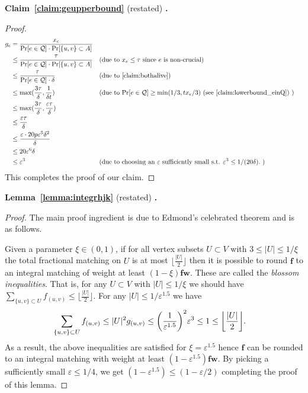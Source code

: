 \documentclass[letterpaper,11pt]{article}
\renewcommand{\epsilon}{\varepsilon}
\renewcommand{\epsilon}[0]{\ensuremath{\varepsilon}}
\let\originalleft\left
\let\originalright\right
\renewcommand{\left}{\mathopen{}\mathclose\bgroup\originalleft}
\renewcommand{\right}{\aftergroup\egroup\originalright}
\newcommand{\restateclaim}[2]{\noindent \textbf{Claim~#1} (restated) \textbf{.} {\em #2}}
\newcommand{\restatelem}[2]{\noindent \textbf{Lemma~#1} (restated) \textbf{.} {\em #2}}
\begin{document}
\restateclaim{\ref{claim:geupperbound}}{\claimgeupperbound{}}

\begin{proof}
\begin{align*}\label{eq:num14}
  g_e &= \frac{x_e}{\Pr[e \in \mathcal{Q}]\cdot\Pr[\{u, v\} \subset A]}  \\
  &\leq \frac{\tau}{\Pr[e \in \mathcal{Q}] \cdot \Pr[\{u, v\} \subset A] } 
  &&
    \text{(due to $x_e \leq \tau$ since $e$ is non-crucial)}
  \\
  &\leq \frac{\tau}{\Pr[e \in \mathcal{Q}] \cdot \delta } 
  &&
    \text{(due to \cref{claim:bothalive})}
  \\
  &\leq \max(\frac{3 \tau}{\delta}, \frac{1}{\delta t}) 
  &&
  \text{(due to $\Pr[e \in \mathcal{Q}] \geq \min(1/3, tx_e/3)$ (see \cref{claim:lowerbound_einQ}) )
  }
  \\
  &\leq \max(\frac{3 \tau}{\delta}, \frac{\epsilon \tau}{\delta}) \\
  &\leq \frac{\epsilon \tau}{\delta} \\
  &\leq \frac{\epsilon \cdot 20p\epsilon^5\delta^2}{\delta} \\
  &\leq 20\epsilon^6 \delta\\
  &\leq \epsilon^3 
  &&
  \text{(due to choosing an $\epsilon$ sufficiently small s.t. $\epsilon^3\leq 1/(20\delta).$ )}
\end{align*}
This completes the proof of our claim.
\end{proof}


\restatelem{\ref{lemma:integrhjk}}{\lemmaintegrhjk{}}

\begin{proof} 
The main proof ingredient is due to Edmond's celebrated theorem \cite{edmonds1965maximum,schrijver2003combinatorial} and is as follows.

Given a parameter $\xi\in (0,1)$, if for all vertex subsets $U\subset V$ with $3\leq |U|\leq 1/\xi$ the total fractional matching on $U$ is at most $\lfloor\frac{|U|}{2}\rfloor$ then it is possible to round $\bm{f}$ to an integral matching of weight at least  $(1-\xi)\bm{f}\bm{w}.$ These are called the {\em blossom inequalities}. 
That is, for any $U\subset V$ with $|U|\leq 1/\xi$ we should have
$\sum_{\{u, v\}\subset U} f_{(u,v)}\leq \lfloor\frac{|U|}{2}\rfloor.$ For any $|U|\leq 1/\epsilon^{1.5}$ we have  
\begin{align*}
    \sum_{\{u, v\}\subset U} f_{(u,v)}&\leq |U|^2 g_{(u,v)} \leq \left(\frac{1}{\epsilon^{1.5}}\right)^2\epsilon^3\leq 1
    \leq \left\lfloor
    \frac{|U|}{2}\right\rfloor.
\end{align*}
As a result, the above inequalities are satisfied for $\xi=\epsilon^{1.5}$ hence $\bm{f}$ can be rounded to an integral matching with weight at least $(1-\epsilon^{1.5})\bm{f}\bm{w}$. By picking a sufficiently small $\epsilon\leq 1/4$, we get $(1-\epsilon^{1.5})\leq  (1-\epsilon/2)$ completing the proof of this lemma.
\end{proof} 

\appendix






\end{document}
